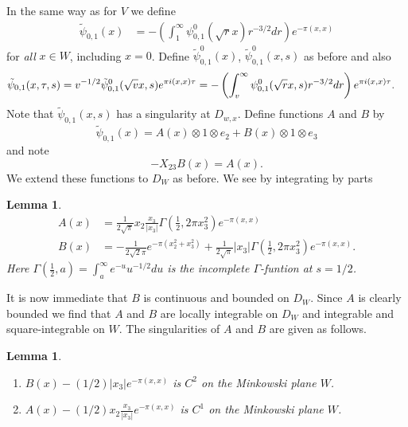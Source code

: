 \documentclass[12pt,leqno]{amsart}
\numberwithin{equation}{section}
\theoremstyle{plain}
\newtheorem{lemma}[theorem]{Lemma}
\theoremstyle{definition}
\theoremstyle{remark}
\newcommand{\G}{\Gamma}
\begin{document}
In the same way as for $V$ we define
\begin{align}\label{Greeneq}
\tilde{\psi}_{0,1}(x)  &= - \left(\int_1^{\infty} \psi_{0,1}^0(\sqrt{r}x) r^{-3/2} dr\right)e^{-\pi(x,x)}
\end{align}
for {\it all} $x \in W$, including $x=0$. Define $\tilde{\psi}_{0,1}^0(x)$, $\tilde{\psi}_{0,1}^0(x,s)$ as before and also
\begin{align}\label{xiZ}
\tilde{\psi}_{0,1}(x,\tau,s) &= v^{-1/2} \tilde{\psi}_{0,1}^0(\sqrt{v}x,s) e^{\pi i (x,x)\tau}  = - \left( \int_v^{\infty} \psi_{0,1}^0(\sqrt{r}x,s) r^{-3/2} dr \right) e^{\pi i (x,x)\tau} \notag.
\end{align}
Note that $\tilde{\psi}_{0,1}(x,s)$ has a singularity at $D_{w,x}$. Define functions $A$ and $B$ by
\[
\tilde{\psi}_{0,1}(x)  = A(x)  \otimes 1 \otimes e_2  + B(x) \otimes 1 \otimes e_3
\]
and note 
\begin{equation}\label{AB-eq}
-X_{23} B(x) = A(x).
\end{equation}
We extend these functions to $D_W$ as before. We see by integrating by parts



\begin{lemma}\label{firstformulaforAandB}
\begin{align*}
A(x) &= 
\frac{1}{2\sqrt{\pi}}  x_2 \frac{x_3}{|x_3|}  \Gamma(\tfrac12,2 \pi x_3^2)  e^{-\pi (x,x)}    \label{AA}\\
B(x)& =
 - \frac{1}{2 \sqrt{2} \pi} e^{- \pi(x_2^2+ x_3^2)} + \frac{1}{2  \sqrt{\pi}}|x_3|    \Gamma(\tfrac12,2 \pi x_3^2)  e^{-\pi (x,x)}.
\end{align*}
Here $\G(\tfrac12,a) = \int_a^{\infty} e^{-u} u^{-1/2} du$ is the incomplete $\G$-funtion at $s=1/2$. 
\end{lemma}

 
It is now immediate that $B$ is continuous and bounded on $D_W$. Since $A$ is clearly bounded
we find that $A$ and $B$ are locally integrable on $D_W$ and integrable and square-integrable on $W$. The singularities of $A$ and $B$ are given as follows.

\begin{lemma}\label{singularitiesofAandB}
\begin{enumerate}
\item[(i)] $B(x) - (1/2)|x_3| e^{-\pi (x,x)} $ is $C^2$ on the Minkowski plane $W$.
\item[(ii)] $A(x)- (1/2) x_2 \frac{x_3}{|x_3|} e^{-\pi (x,x)}$ is $C^1$ on the Minkowski plane $W$.
\end{enumerate}
\end{lemma}
\end{document}
